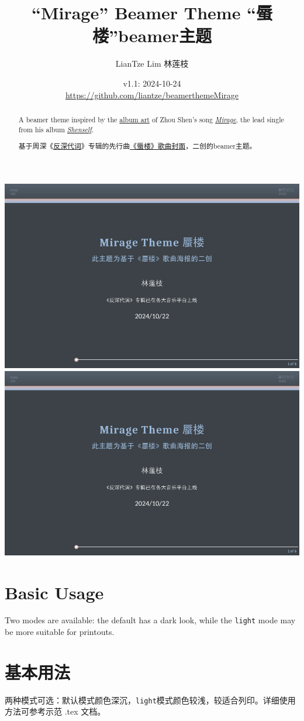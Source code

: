 \documentclass{article}
\title{``Mirage'' Beamer Theme “蜃楼”beamer主题}
\author{LianTze Lim 林莲枝}
\date{v1.1: 2024-10-24\\\url{https://github.com/liantze/beamerthemeMirage}}
\begin{document}
\maketitle

\begin{paracol}{2}
\begin{abstract}
A beamer theme inspired by the
\href{https://www.instagram.com/juncenart/p/C5LuwoSrBnW/?img_index=2}{album art} of Zhou Shen's song \href{https://open.spotify.com/track/1PR9aOkY0dyRRL81YXv9a4}{\emph{Mirage}},
the lead single from his album \href{https://open.spotify.com/album/6IcyslRZfwWzpdhnFML6cd}{\emph{Shenself}}.
\end{abstract}

\switchcolumn

\renewcommand*{\abstractname}{摘要}
\begin{abstract}
基于周深《\href{https://y.qq.com/n/ryqq/albumDetail/003szpvI3LMhQ7}{反深}\href{https://music.163.com/\#/album?id=190605791}{代词}》专辑的先行曲\href{http://xhslink.com/a/oF7IHZ0uUYkY}{《蜃楼》歌曲封面}，二创的beamer主题。
\end{abstract}
\end{paracol}

\begin{center}
\includegraphics[page=1,width=.495\hsize]{mirage-beamer-zh.pdf}
\includegraphics[page=5,width=.495\hsize]{mirage-beamer-zh.pdf}
\end{center}
    
\begin{paracol}{2}
\section{Basic Usage}

Two modes are available: the default has a dark look, while the
\texttt{light} mode may be more suitable for printouts.

\switchcolumn

\section{基本用法}

两种模式可选：默认模式颜色深沉，\texttt{light}模式颜色较浅，较适合列印。详细使用方法可参考示范 .tex 文档。

\end{paracol}
\end{document}
